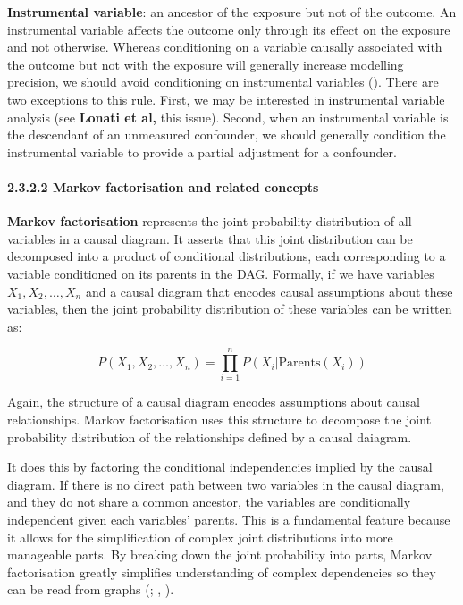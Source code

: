 \documentclass[
  singlecolumn]{article}
\let\oldparagraph\paragraph
\renewcommand{\paragraph}[1]{\oldparagraph{#1}\mbox{}}
\begin{document}
\textbf{Instrumental variable}: an ancestor of the exposure but not of
the outcome. An instrumental variable affects the outcome only through
its effect on the exposure and not otherwise. Whereas conditioning on a
variable causally associated with the outcome but not with the exposure
will generally increase modelling precision, we should avoid
conditioning on instrumental variables
(). There are two
exceptions to this rule. First, we may be interested in instrumental
variable analysis (see \textbf{Lonati et al,} this issue). Second, when
an instrumental variable is the descendant of an unmeasured confounder,
we should generally condition the instrumental variable to provide a
partial adjustment for a confounder.

\paragraph{2.3.2.2 Markov factorisation and related
concepts}\label{markov-factorisation-and-related-concepts}

\textbf{Markov factorisation} represents the joint probability
distribution of all variables in a causal diagram. It asserts that this
joint distribution can be decomposed into a product of conditional
distributions, each corresponding to a variable conditioned on its
parents in the DAG. Formally, if we have variables
\(X_1, X_2, \dots, X_n\) and a causal diagram that encodes causal
assumptions about these variables, then the joint probability
distribution of these variables can be written as:

\[
P(X_1, X_2, \dots, X_n) = \prod_{i=1}^{n} P(X_i | \text{Parents}(X_i))
\]

Again, the structure of a causal diagram encodes assumptions about
causal relationships. Markov factorisation uses this structure to
decompose the joint probability distribution of the relationships
defined by a causal daiagram.

It does this by factoring the conditional independencies implied by the
causal diagram. If there is no direct path between two variables in the
causal diagram, and they do not share a common ancestor, the variables
are conditionally independent given each variables' parents. This is a
fundamental feature because it allows for the simplification of complex
joint distributions into more manageable parts. By breaking down the
joint probability into parts, Markov factorisation greatly simplifies
understanding of complex dependencies so they can be read from graphs
(;
, ).
\end{document}
